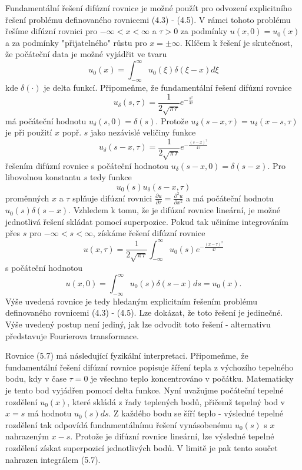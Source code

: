 \documentclass[a4paper]{book}
\begin{document}
Fundamentální řešení difúzní rovnice je možné použít pro odvození explicitního řešení problému definovaného rovnicemi (4.3) - (4.5). V rámci tohoto problému řešíme difúzní rovnici pro $-\infty < x < \infty$ a $\tau > 0$ za podmínky $u(x, 0) = u_0(x)$ a za podmínky "přijatelného" růstu pro $x = \pm \infty$. Klíčem k řešení je skutečnost, že počáteční data je možné vyjádřit ve tvaru
\begin{equation*}
u_0(x) = \int^{\infty}_{-\infty}u_0(\xi)\delta(\xi - x)d\xi
\end{equation*}
kde $\delta(\cdot)$ je delta funkcí. Připomeňme, že fundamentální řešení difúzní rovnice
\begin{equation*}
u_{\delta}(s, \tau) = \frac{1}{2 \sqrt{\pi \tau}}e^{-\frac{s^2}{4 \tau}}
\end{equation*}
má počáteční hodnotu $u_{\delta}(s,0) = \delta(s)$. Protože $u_{\delta}(s-x,\tau) = u_{\delta}(x-s, \tau)$ je při použití $x$ popř. $s$ jako nezávislé veličiny funkce
\begin{equation*}
u_{\delta}(s-x, \tau) = \frac{1}{2 \sqrt{\pi \tau}}e^{-\frac{(s-x)^2}{4 \tau}}
\end{equation*}
řešením difúzní rovnice s počáteční hodnotou $u_{\delta}(s-x,0) = \delta(s-x)$. Pro libovolnou konstantu $s$ tedy funkce
\begin{equation*}
u_0(s)u_{\delta}(s-x, \tau)
\end{equation*}
proměnných $x$ a $\tau$ splňuje difúzní rovnici $\frac{\partial u}{\partial \tau} = \frac{\partial^2 u}{\partial x^2}$ a má počáteční hodnotu $u_0(s)\delta(s-x)$. Vzhledem k tomu, že je difúzní rovnice lineární, je možné jednotlivá řešení skládat pomocí superpozice. Pokud tak učiníme integrováním přes $s$ pro $-\infty < s < \infty$, získáme řešení difúzní rovnice
\begin{equation}
u(x, \tau) = \frac{1}{2 \sqrt{\pi \tau}} \int^{\infty}_{-\infty} u_0(s)e^{-\frac{(x-\tau)^2}{4 \tau}}
\end{equation}
s počáteční hodnotou
\begin{equation*}
u(x,0) = \int^{\infty}_{-\infty}u_0(s)\delta(s-x)ds = u_0(x).
\end{equation*}
Výše uvedená rovnice je tedy hledaným explicitním řešením problému definovaného rovnicemi (4.3) - (4.5). Lze dokázat, že toto řešení je jedinečné. Výše uvedený postup není jediný, jak lze odvodit toto řešení - alternativu představuje Fourierova transformace.

Rovnice (5.7) má následující fyzikální interpretaci. Připomeňme, že fundamentální řešení difúzní rovnice popisuje šíření tepla z výchozího tepelného bodu, kdy v čase $\tau = 0$ je všechno teplo koncentrováno v počátku. Matematicky je tento bod vyjádřen pomocí delta funkce. Nyní uvažujme počáteční tepelné rozdělení $u_0(x)$, které skládá z řady teplených bodů, přičemž tepelný bod v $x = s$ má hodnotu $u_0(s)ds$. Z každého bodu se šíří teplo - výsledné tepelné rozdělení tak odpovídá fundamentálnímu řešení vynásobenému $u_0(s)$ s $x$ nahrazeným $x-s$. Protože je difúzní rovnice lineární, lze výsledné tepelné rozdělení získat superpozicí jednotlivých bodů. V limitě je pak tento součet nahrazen integrálem (5.7).
\end{document}
